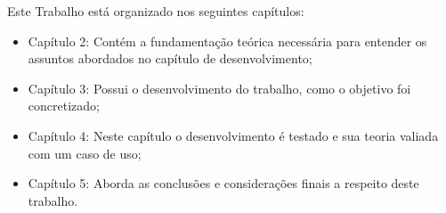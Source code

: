 Este Trabalho está organizado nos seguintes capítulos:

\begin{itemize}
	\item Capítulo 2: Contém a fundamentação teórica necessária para entender os assuntos abordados no capítulo de desenvolvimento;
	\item Capítulo 3: Possui o desenvolvimento do trabalho, como o objetivo foi concretizado;
	\item Capítulo 4: Neste capítulo o desenvolvimento é testado e sua teoria valiada com um caso de uso;
	\item Capítulo 5: Aborda as conclusões e considerações finais a respeito deste trabalho.
\end{itemize}